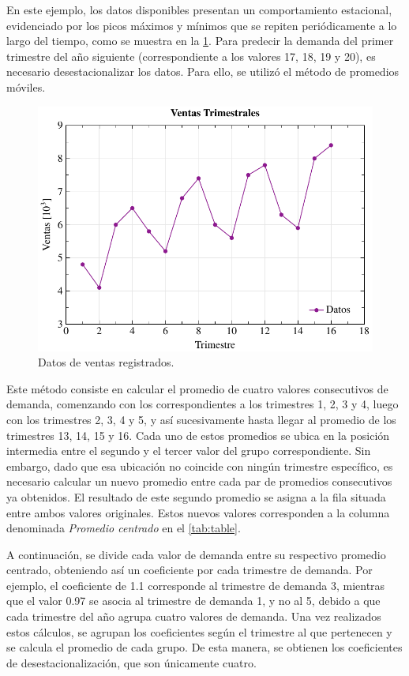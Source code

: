 En este ejemplo, los datos disponibles presentan un comportamiento estacional,
evidenciado por los picos máximos y mínimos que se repiten periódicamente a lo
largo del tiempo, como se muestra en la \cref{fig:season-data}.
Para predecir la demanda del primer trimestre del año siguiente
(correspondiente a los valores 17, 18, 19 y 20), es necesario
desestacionalizar los datos.
Para ello, se utilizó el método de promedios móviles.

\begin{figure}[htpb!]
  \centering
  \includegraphics[width=\columnwidth]{../Figures/season-data.pdf}
  \caption{Datos de ventas registrados.}
  \label{fig:season-data}
\end{figure}

Este método consiste en calcular el promedio de cuatro valores consecutivos de
demanda, comenzando con los correspondientes a los trimestres 1, 2, 3 y 4,
luego con los trimestres 2, 3, 4 y 5, y así sucesivamente hasta llegar al
promedio de los trimestres 13, 14, 15 y 16.
Cada uno de estos promedios se ubica en la posición intermedia entre el segundo
y el tercer valor del grupo correspondiente.
Sin embargo, dado que esa ubicación no coincide con ningún trimestre específico,
es necesario calcular un nuevo promedio entre cada par de promedios consecutivos
ya obtenidos.
El resultado de este segundo promedio se asigna a la fila situada entre ambos
valores originales.
Estos nuevos valores corresponden a la columna denominada \textit{Promedio centrado}
en el \cref{tab:table}.

A continuación, se divide cada valor de demanda entre su respectivo promedio
centrado, obteniendo así un coeficiente por cada trimestre de demanda.
Por ejemplo, el coeficiente de 1.1 corresponde al trimestre de demanda 3, mientras
que el valor 0.97 se asocia al trimestre de demanda 1, y no al 5, debido a que
cada trimestre del año agrupa cuatro valores de demanda.
Una vez realizados estos cálculos, se agrupan los coeficientes según el
trimestre al que pertenecen y se calcula el promedio de cada grupo.
De esta manera, se obtienen los coeficientes de desestacionalización, que son
únicamente cuatro.

